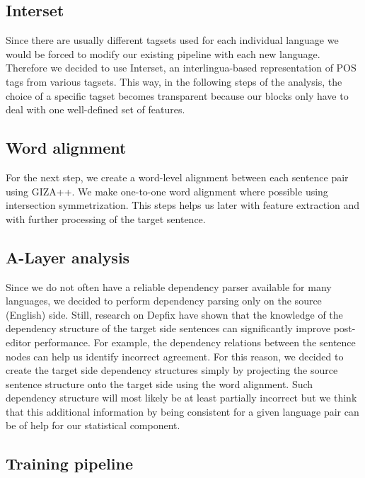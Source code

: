 \subsection{Interset}

Since there are usually different tagsets used for each individual language
we would be forced to modify our existing pipeline with each new language.
Therefore we decided to use Interset\cite{biblio:ZeReusableTagset2008}, an interlingua-based
representation of POS tags from various tagsets. This way, in the following steps of the analysis,
the choice of a specific tagset becomes transparent because our blocks only
have to deal with one well-defined set of features.

\subsection{Word alignment}

For the next step, we create a word-level alignment between each sentence pair
using GIZA++\cite{och:ney:2000}. We make one-to-one word alignment where possible
using intersection symmetrization. This steps helps us later with feature extraction
and with further processing of the target sentence.

\subsection{A-Layer analysis}

Since we do not often have a reliable dependency parser available for many languages,
we decided to perform dependency parsing only on the source (English) side.
Still, research on Depfix have shown that the knowledge of the dependency structure
of the target side sentences can significantly improve post-editor performance.
For example, the dependency relations between the sentence nodes can help us identify
incorrect agreement. For this reason, we decided to create the target side dependency
structures simply by projecting the source sentence structure onto the target side
using the word alignment.
Such dependency structure will most likely be at least partially incorrect but we
think that this additional information by being consistent for a given language pair
can be of help for our statistical component.

\subsection{Training pipeline}

